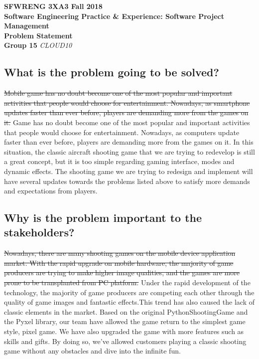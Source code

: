 \documentclass[11pt,fleqn]{article}
\begin{document}
\begin{center}
	{\large \textbf{SFWRENG 3XA3 Fall 2018}}\\[2mm]
	{\textbf{Software Engineering Practice \& Experience: Software Project Management}}\\[2mm]
	{\huge \textbf{Problem Statement}}\\[2mm]
	{\large \textbf{Group 15}  \emph{CLOUD10}}\\
\end{center}
\subsection*{What is the problem going to be solved?}
\sout{Mobile game has no doubt become one of the most popular and important activities that people would choose for entertainment. Nowadays, as smartphone updates faster than ever before, players are demanding more from the games on it.} {\color{red}Game has no doubt become one of the most popular and important activities that people would choose for entertainment. Nowadays, as computers update faster than ever before, players are demanding more from the games on it.} In this situation, the classic aircraft shooting game that we are trying to redevelop is still a great concept, but it is too simple regarding gaming interface, modes and dynamic effects. The shooting game we are trying to redesign and implement will have several updates towards the problems listed above to satisfy more demands and expectations from players.
\subsection*{Why is the problem important to the stakeholders?}
\sout{Nowadays, there are many shooting games on the mobile device application market. With the rapid upgrade on mobile hardware, the majority of game producers are trying to make higher image qualities, and the games are more prone to be transplanted from PC platform.} {\color{red}Under the rapid development of the technology, the majority of game producers are competing each other through the quality of game images and fantastic effects.}This trend has also caused the lack of classic elements in the market.  Based on the original PythonShootingGame and the Pyxel library, our team have allowed the game return to the simplest game style, pixel game. We have also upgraded the game with more features such as skills and gifts. By doing so, we've allowed customers playing a classic shooting game without any obstacles and dive into the infinite fun. 
\end{document}
